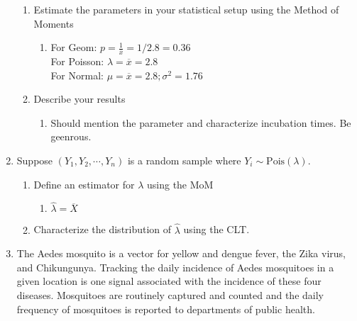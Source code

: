 \documentclass[krantz1,ChapterTOCs]{krantz}
\begin{document}
\begin{enumerate}
\begin{enumerate}
        \item Estimate the parameters in your statistical setup using the Method of Moments
        \begin{enumerate}
            \item {
            \color{red} 
                For Geom:    $p = \frac{1}{\overline{x}} = 1/ 2.8 = 0.36 $\\
                For Poisson: $\lambda = \overline{x} = 2.8 $\\
                For Normal:    $\mu = \overline{x} = 2.8; \sigma^{2} = 1.76   $\\
                
            } 
        \end{enumerate}
        
        
        \item Describe your results
        \begin{enumerate}
            \item {
            \color{red} 
                Should mention the parameter and characterize incubation times. Be geenrous. 
            } 
        \end{enumerate}

        
    \end{enumerate}
    
    \item Suppose $(Y_{1},Y_{2},\cdots,Y_{n})$ is a random sample where $Y_{i} \sim \text{Pois}(\lambda)$.
    \begin{enumerate}
        \item Define an estimator for $\lambda$ using the MoM
        \begin{enumerate}
            \item {
            \color{red} 
                $\hat{\lambda} = \overline{X}$
            } 
        \end{enumerate}
        
        \item Characterize the distribution of $\hat{\lambda}$ using the CLT.

    \end{enumerate}
    
    \item The Aedes mosquito is a vector for yellow and dengue fever, the Zika virus, and Chikungunya. Tracking the daily incidence of Aedes mosquitoes in a given location is one signal associated with the incidence of these four diseases. Mosquitoes are routinely captured and counted and the daily frequency of mosquitoes is reported to departments of public health.
    

\end{enumerate}
\end{document}
